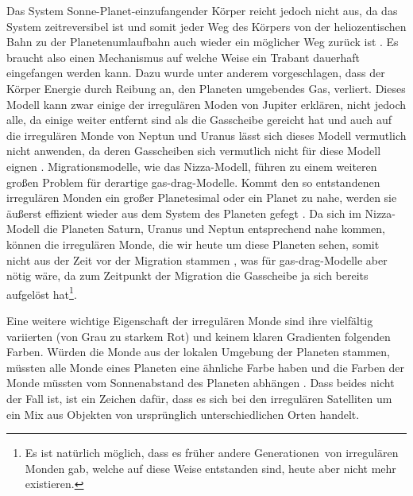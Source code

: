 \documentclass[12pt,a4paper,twoside,open=right,bibliography=totoc]{scrbook}
\renewcommand{\cite}{ \citep}
\begin{document}
Das System Sonne-Planet-einzufangender Körper reicht jedoch nicht aus, da das System zeitreversibel ist und somit jeder Weg des Körpers von der heliozentischen Bahn zu der Planetenumlaufbahn auch wieder ein möglicher Weg zurück ist\cite{Nesvorny2007}.
Es braucht also einen Mechanismus auf welche Weise ein Trabant dauerhaft eingefangen werden kann. Dazu wurde unter anderem vorgeschlagen, dass der Körper Energie durch Reibung an, den Planeten umgebendes Gas, verliert.
Dieses Modell kann zwar einige der irregulären Moden von Jupiter erklären, nicht jedoch alle, da einige weiter entfernt sind als die Gasscheibe gereicht hat und auch auf die irregulären Monde von Neptun und Uranus lässt sich dieses Modell vermutlich nicht anwenden, da deren Gasscheiben sich vermutlich nicht für diese Modell eignen\cite{Pollack1991,Pollack1996,Nesvorny2007}.
Migrationsmodelle, wie das Nizza-Modell, führen zu einem weiteren großen Problem für derartige \glqq gas-drag\grqq-Modelle. Kommt den so entstandenen irregulären Monden ein großer Planetesimal oder ein Planet zu nahe, werden sie äußerst effizient wieder aus dem System des Planeten gefegt\cite{Nesvorny2007}. Da sich im Nizza-Modell die Planeten Saturn, Uranus und Neptun entsprechend nahe kommen, können die irregulären Monde, die wir heute um diese Planeten sehen, somit nicht aus der Zeit vor der Migration stammen\cite{Tsiganis2005,Nesvorny2007}, was für \glqq gas-drag\grqq-Modelle aber nötig wäre, da zum Zeitpunkt der Migration die Gasscheibe ja sich bereits aufgelöst hat\footnote{Es ist natürlich möglich, dass es früher andere \glqq Generationen\grqq\ von irregulären Monden gab, welche auf diese Weise entstanden sind, heute aber nicht mehr existieren. }.

Eine weitere wichtige Eigenschaft der irregulären Monde sind ihre vielfältig variierten (von Grau zu starkem Rot) und keinem klaren Gradienten folgenden Farben. Würden die Monde aus der lokalen Umgebung der Planeten stammen, müssten alle Monde eines Planeten eine ähnliche Farbe haben und die Farben der Monde müssten vom Sonnenabstand des Planeten abhängen\cite{Degewij1980Icar,Cruikshank1980Icar,Dumas1998Icar, Sykes2000Icar,Brown2000AJ,Grav2003Icar,Grav2004ApJ,GravHolman2004ApJ,Porco2005Sci,Nesvorny2007}. Dass beides nicht der Fall ist, ist ein Zeichen dafür, dass es sich bei den irregulären Satelliten um ein Mix aus Objekten von ursprünglich unterschiedlichen Orten handelt.
\end{document}
